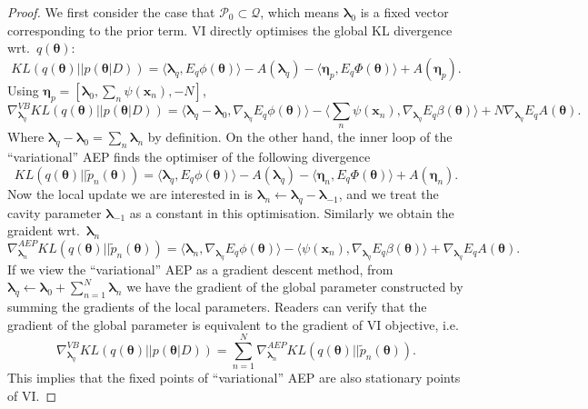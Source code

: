 \documentclass{article} %
\begin{document}
\begin{proof}
We first consider the case that $\mathcal{P}_0 \subset \mathcal{Q}$, which means $\bm{\lambda}_0$ is a fixed vector corresponding to the prior term. VI directly optimises the global KL divergence wrt.~$q(\bm{\theta})$:
\begin{equation}
KL(q(\bm{\theta}) || p(\bm{\theta} | D)) = \langle \bm{\lambda}_q, E_q \phi(\bm{\theta}) \rangle - A(\bm{\lambda}_q) - \langle \bm{\eta}_p, E_q \Phi(\bm{\theta}) \rangle + A(\bm{\eta}_p).
\end{equation}
Using $\bm{\eta}_p = [\bm{\lambda}_0, \sum_{n} \psi(\bm{x}_n), -N]$,
\begin{equation}
\nabla_{\bm{\lambda}_q}^{VB} KL(q(\bm{\theta}) || p(\bm{\theta} | D)) = \langle \bm{\lambda}_q - \bm{\lambda}_0, \nabla_{\bm{\lambda}_q} E_q \phi(\bm{\theta}) \rangle - \langle \sum_{n} \psi(\bm{x}_n), \nabla_{\bm{\lambda}_q} E_q \beta(\bm{\theta}) \rangle + N \nabla_{\bm{\lambda}_q} E_q A(\bm{\theta}).
\end{equation}
Where $\bm{\lambda}_q - \bm{\lambda}_0 = \sum_n \bm{\lambda}_n$ by definition. On the other hand, the inner loop of the ``variational'' AEP finds the optimiser of the following divergence
\begin{equation}
KL(q(\bm{\theta}) || \tilde{p}_n(\bm{\theta})) = \langle \bm{\lambda}_q, E_q \phi(\bm{\theta}) \rangle - A(\bm{\lambda}_q) - \langle \bm{\eta}_n, E_q \Phi(\bm{\theta}) \rangle + A(\bm{\eta}_n).
\end{equation}
Now the local update we are interested in is $\bm{\lambda}_n \leftarrow \bm{\lambda}_q - \bm{\lambda}_{-1}$, and we treat the cavity parameter $\bm{\lambda}_{-1}$ as a constant in this optimisation. Similarly we obtain the graident wrt.~$\bm{\lambda}_n$
\begin{equation}
\nabla_{\bm{\lambda}_n}^{AEP} KL(q(\bm{\theta}) || \tilde{p}_n(\bm{\theta})) = \langle \bm{\lambda}_n, \nabla_{\bm{\lambda}_q} E_q \phi(\bm{\theta}) \rangle - \langle \psi(\bm{x}_n), \nabla_{\bm{\lambda}_q} E_q \beta(\bm{\theta}) \rangle +  \nabla_{\bm{\lambda}_q} E_q A(\bm{\theta}).
\end{equation}
If we view the ``variational'' AEP as a gradient descent method, from $\bm{\lambda}_q \leftarrow \bm{\lambda}_0 + \sum_{n=1}^N \bm{\lambda}_n$ we have the gradient of the global parameter constructed by summing the gradients of the local parameters. Readers can verify that the gradient of the global parameter is equivalent to the gradient of VI objective, i.e.
\begin{equation}
\nabla_{\bm{\lambda}_q}^{VB} KL(q(\bm{\theta}) || p(\bm{\theta} | D)) = \sum_{n=1}^N \nabla_{\bm{\lambda}_n}^{AEP} KL(q(\bm{\theta}) || \tilde{p}_n(\bm{\theta})).
\end{equation}
This implies that the fixed points of ``variational'' AEP are also stationary points of VI.


\end{proof}
\end{document}
